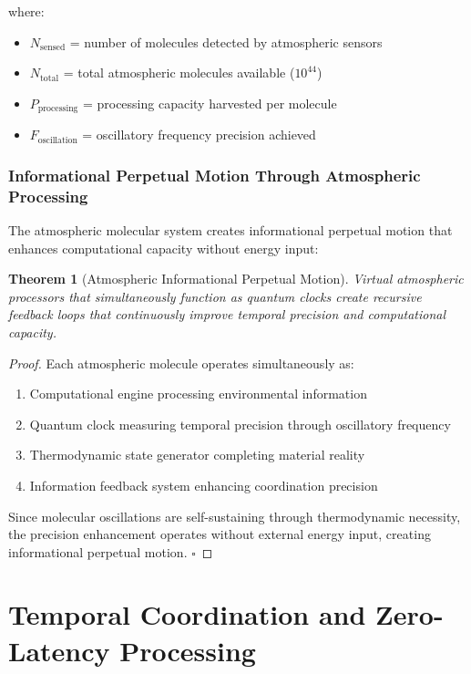 \documentclass[12pt,a4paper]{article}
\newtheorem{theorem}{Theorem}
\begin{document}
where:
\begin{itemize}
\item $N_{\text{sensed}}$ = number of molecules detected by atmospheric sensors
\item $N_{\text{total}}$ = total atmospheric molecules available ($10^{44}$)
\item $P_{\text{processing}}$ = processing capacity harvested per molecule
\item $F_{\text{oscillation}}$ = oscillatory frequency precision achieved
\end{itemize}

\subsubsection{Informational Perpetual Motion Through Atmospheric Processing}

The atmospheric molecular system creates informational perpetual motion that enhances computational capacity without energy input:

\begin{theorem}[Atmospheric Informational Perpetual Motion]
Virtual atmospheric processors that simultaneously function as quantum clocks create recursive feedback loops that continuously improve temporal precision and computational capacity.
\end{theorem}

\begin{proof}
Each atmospheric molecule operates simultaneously as:
\begin{enumerate}
\item Computational engine processing environmental information
\item Quantum clock measuring temporal precision through oscillatory frequency
\item Thermodynamic state generator completing material reality
\item Information feedback system enhancing coordination precision
\end{enumerate}

Since molecular oscillations are self-sustaining through thermodynamic necessity, the precision enhancement operates without external energy input, creating informational perpetual motion. $\square$
\end{proof}

\section{Temporal Coordination and Zero-Latency Processing}
\end{document}
